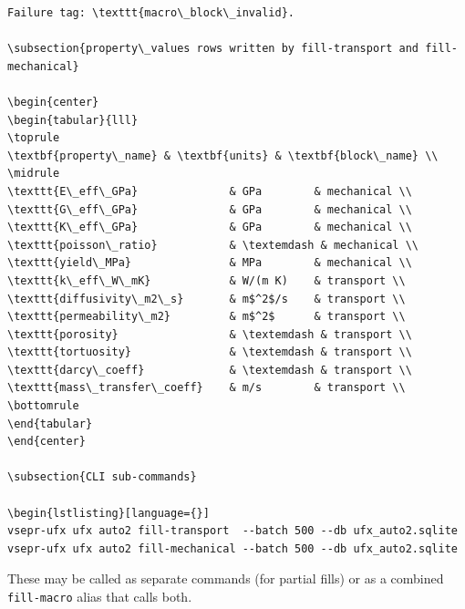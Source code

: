 \documentclass[11pt, a4paper]{article}
\begin{document}
\begin{lstlisting}[language={}]
Failure tag: \texttt{macro\_block\_invalid}.

\subsection{property\_values rows written by fill-transport and fill-mechanical}

\begin{center}
\begin{tabular}{lll}
\toprule
\textbf{property\_name} & \textbf{units} & \textbf{block\_name} \\
\midrule
\texttt{E\_eff\_GPa}              & GPa        & mechanical \\
\texttt{G\_eff\_GPa}              & GPa        & mechanical \\
\texttt{K\_eff\_GPa}              & GPa        & mechanical \\
\texttt{poisson\_ratio}           & \textemdash & mechanical \\
\texttt{yield\_MPa}               & MPa        & mechanical \\
\texttt{k\_eff\_W\_mK}            & W/(m K)    & transport \\
\texttt{diffusivity\_m2\_s}       & m$^2$/s    & transport \\
\texttt{permeability\_m2}         & m$^2$      & transport \\
\texttt{porosity}                 & \textemdash & transport \\
\texttt{tortuosity}               & \textemdash & transport \\
\texttt{darcy\_coeff}             & \textemdash & transport \\
\texttt{mass\_transfer\_coeff}    & m/s        & transport \\
\bottomrule
\end{tabular}
\end{center}

\subsection{CLI sub-commands}

\begin{lstlisting}[language={}]
vsepr-ufx ufx auto2 fill-transport  --batch 500 --db ufx_auto2.sqlite
vsepr-ufx ufx auto2 fill-mechanical --batch 500 --db ufx_auto2.sqlite
\end{lstlisting}

These may be called as separate commands (for partial fills) or as a combined
\texttt{fill-macro} alias that calls both.
\end{document}
